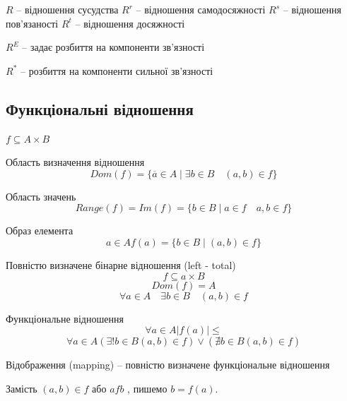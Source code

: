 \begin{example}  
    $R$ -- відношення сусудства
    $R^{r}$ -- відношення самодосяжності
    $R^{s}$ -- відношення пов'язаності
    $R^{t}$ -- відношення досяжності
    
    $R^{E}$ -- задає розбиття на компоненти зв'язності
    
    $R^{*}$ -- розбиття на компоненти сильної зв'язності
\end{example}

\subsection{Функціональні відношення}

$f \subseteq A \times B$

\begin{definition}
    Область визначення відношення
    $$Dom(f) = \{ \overline{a} \in A \mid \exists b \in B \quad (a, b) \in f \}$$    
\end{definition}

\begin{definition}
    Область значень
    $$Range(f) = Im(f) = \{ b \in B \mid a \in f \quad a, b \in f \}$$
\end{definition}

\begin{definition}
    Образ елемента
    $$a \in A f(a) = \{ b \in B \mid (a, b) \in f\}$$
\end{definition}

\begin{definition}
    Повністю визначене бінарне відношення (left - total)
    $$f \subseteq a \times B$$
    $$Dom(f) = A$$
    $$\forall a \in A \quad \exists b \in B \quad (a, b) \in f$$
\end{definition}

\begin{definition}
    Функціональне відношення
    $$\forall a \in A |f(a)| \leqslant$$
    $$\forall a \in A (\exists! b \in B (a, b) \in f) \vee (\nexists b \in B (a, b) \in f)$$
\end{definition}

\begin{definition}[Відображення]
    Відображення (mapping) -- повністю визначене функціональне відношення
\end{definition}

Замість $(a, b) \in f$ або $afb$ , пишемо $b = f(a)$.

